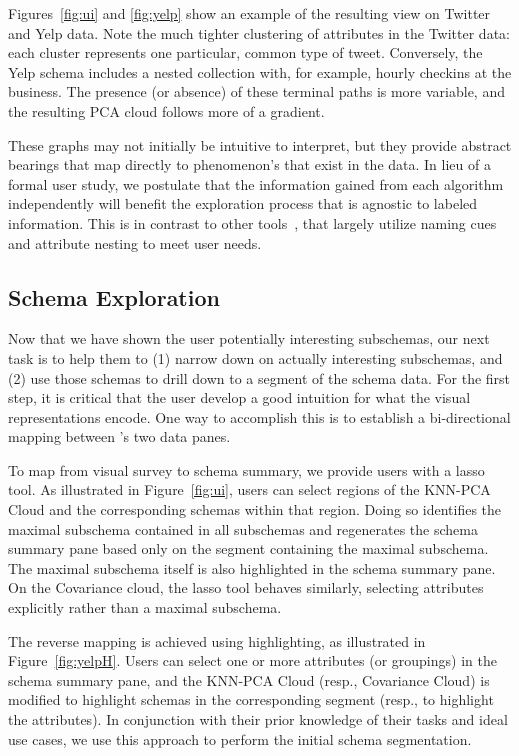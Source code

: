 \begin{example}
Figures~\ref{fig:ui} and \ref{fig:yelp} show an example of the resulting view on Twitter and Yelp data.
Note the much tighter clustering of attributes in the Twitter data: each cluster represents one particular, common type of tweet.
Conversely, the Yelp schema includes a nested collection with, for example, hourly checkins at the business.  
The presence (or absence) of these terminal paths is more variable, and the resulting PCA cloud follows more of a gradient.
\end{example}

These graphs may not initially be intuitive to interpret, but they provide abstract bearings that map directly to phenomenon’s that exist in the data. In lieu of a formal user study, we postulate that the information gained from each algorithm independently will benefit the exploration process that is agnostic to labeled information. This is in contrast to other tools~\cite{facetmap}, that largely utilize naming cues and attribute nesting to meet user needs.

\subsection{Schema Exploration}

Now that we have shown the user potentially interesting subschemas, our next task is to help them to (1) narrow down on actually interesting subschemas, and (2) use those schemas to drill down to a segment of the schema data.
For the first step, it is critical that the user develop a good intuition for what the visual representations encode.
One way to accomplish this is to establish a bi-directional mapping between \systemnametwo's two data panes.

To map from visual survey to schema summary, we provide users with a lasso tool.
As illustrated in Figure~\ref{fig:ui}, users can select regions of the KNN-PCA Cloud and the corresponding schemas within that region.  Doing so identifies the maximal subschema contained in all subschemas and regenerates the schema summary pane based only on the segment containing the maximal subschema.  
The maximal subschema itself is also highlighted in the schema summary pane.
On the Covariance cloud, the lasso tool behaves similarly, selecting attributes explicitly rather than a maximal subschema.

The reverse mapping is achieved using highlighting, as illustrated in Figure~\ref{fig:yelpH}.
Users can select one or more attributes (or groupings) in the schema summary pane, and the KNN-PCA Cloud (resp., Covariance Cloud) is modified to highlight schemas in the corresponding segment (resp., to highlight the attributes).
In conjunction with their prior knowledge of their tasks and ideal use cases, we use this approach to perform the initial schema segmentation.

